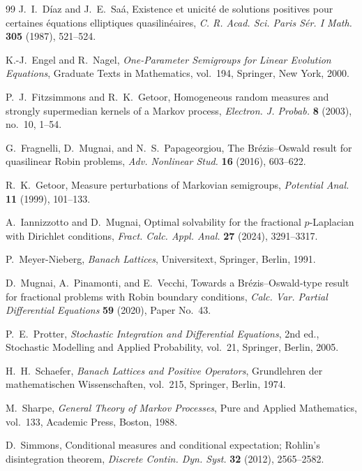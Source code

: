 \documentclass[11pt,a4paper,reqno]{amsart}
\theoremstyle{definition}
\numberwithin{equation}{section}
\begin{document}
\begin{thebibliography}{99}
J.~I.~D\'iaz and J.~E.~Sa\'a,
\newblock Existence et unicit\'e de solutions positives pour certaines
\'equations elliptiques quasilin\'eaires,
\newblock \emph{C. R. Acad. Sci. Paris S\'er. I Math.}
\textbf{305} (1987), 521--524.

K.-J.~Engel and R.~Nagel,
\newblock \emph{One-Parameter Semigroups for Linear Evolution Equations},
\newblock Graduate Texts in Mathematics, vol.~194,
Springer, New York, 2000.

P.~J.~Fitzsimmons and R.~K.~Getoor,
\newblock Homogeneous random measures and strongly supermedian kernels of a Markov process,
\newblock \emph{Electron. J. Probab.} \textbf{8} (2003), no.~10, 1--54.

G.~Fragnelli, D.~Mugnai, and N.~S.~Papageorgiou,
\newblock The Br\'ezis--Oswald result for quasilinear Robin problems,
\newblock \emph{Adv. Nonlinear Stud.} \textbf{16} (2016), 603--622.

R.~K.~Getoor,
\newblock Measure perturbations of Markovian semigroups,
\newblock \emph{Potential Anal.} \textbf{11} (1999), 101--133.

A.~Iannizzotto and D.~Mugnai,
\newblock Optimal solvability for the fractional $p$-Laplacian with Dirichlet conditions,
\newblock \emph{Fract. Calc. Appl. Anal.} \textbf{27} (2024), 3291--3317.

P.~Meyer-Nieberg,
\newblock \emph{Banach Lattices},
\newblock Universitext,
Springer, Berlin, 1991.

D.~Mugnai, A.~Pinamonti, and E.~Vecchi,
\newblock Towards a Br\'ezis--Oswald-type result for fractional problems with Robin boundary conditions,
\newblock \emph{Calc. Var. Partial Differential Equations}
\textbf{59} (2020), Paper No.~43.

P.~E.~Protter,
\newblock \emph{Stochastic Integration and Differential Equations},
\newblock 2nd ed., Stochastic Modelling and Applied Probability, vol.~21,
Springer, Berlin, 2005.

H.~H.~Schaefer,
\newblock \emph{Banach Lattices and Positive Operators},
\newblock Grundlehren der mathematischen Wissenschaften, vol.~215,
Springer, Berlin, 1974.

M.~Sharpe,
\newblock \emph{General Theory of Markov Processes},
\newblock Pure and Applied Mathematics, vol.~133,
Academic Press, Boston, 1988.

D.~Simmons,
\newblock Conditional measures and conditional expectation; Rohlin's disintegration theorem,
\newblock \emph{Discrete Contin. Dyn. Syst.} \textbf{32} (2012), 2565--2582.

\end{thebibliography}
\end{document}
